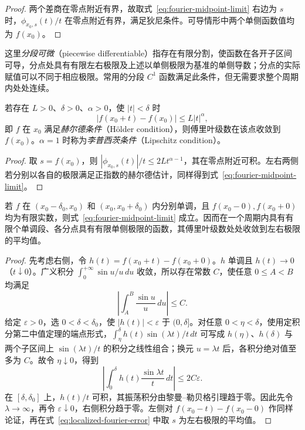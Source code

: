 \begin{proof}
两个差商在零点附近有界，故取式~\eqref{eq:fourier-midpoint-limit} 右边为 $s$ 时，$\phi_{x_0,s}(t)/t$ 在零点附近有界，满足狄尼条件。可导情形中两个单侧函数值均为 $f(x_0)$。
\end{proof}

这里\emph{分段可微}（piecewise differentiable）指存在有限分割，使函数在各开子区间可导，分点处具有有限左右极限及上述以单侧极限为基准的单侧导数；分点的实际赋值可以不同于相应极限。常用的分段 $C^1$ 函数满足此条件，但无需要求整个周期内处处连续。

\begin{corollary}[李普西茨判别法]
\label{cor:holder-fourier-convergence}
若存在 $L>0$、$\delta>0$、$\alpha>0$，使 $|t|<\delta$ 时
\[
    |f(x_0+t)-f(x_0)|\leq L|t|^\alpha,
\]
即 $f$ 在 $x_0$ 满足\emph{赫尔德条件}（H\"older condition），则傅里叶级数在该点收敛到 $f(x_0)$。$\alpha=1$ 时称为\emph{李普西茨条件}（Lipschitz condition）。
\end{corollary}

\begin{proof}
取 $s=f(x_0)$，则 $|\phi_{x_0,s}(t)|/t\leq2Lt^{\alpha-1}$，其在零点附近可积。左右两侧若分别以各自的极限满足正指数的赫尔德估计，同样得到式~\eqref{eq:fourier-midpoint-limit}。
\end{proof}

\begin{theorem}[狄利克雷判别法]
\label{thm:dirichlet-fourier-convergence}
若 $f$ 在 $(x_0-\delta_0,x_0)$ 和 $(x_0,x_0+\delta_0)$ 内分别单调，且 $f(x_0-0),f(x_0+0)$ 均为有限实数，则式~\eqref{eq:fourier-midpoint-limit} 成立。因而在一个周期内具有有限个单调段、各分点具有有限单侧极限的函数，其傅里叶级数处处收敛到左右极限的平均值。
\end{theorem}

\begin{proof}
先考虑右侧，令 $h(t)=f(x_0+t)-f(x_0+0)$。$h$ 单调且 $h(t)\to0$（$t\downarrow0$）。广义积分 $\int_0^{+\infty}\sin u/u\,du$ 收敛，所以存在常数 $C$，使任意 $0\leq A<B$ 均满足
\[
    \left|\int_A^B\frac{\sin u}{u}\,du\right|\leq C.
\]
给定 $\varepsilon>0$，选 $0<\delta<\delta_0$，使 $|h(t)|<\varepsilon$ 于 $(0,\delta]$。对任意 $0<\eta<\delta$，使用定积分第二中值定理的端点形式，$\int_\eta^\delta h(t)\sin(\lambda t)/t\,dt$ 可写成 $h(\eta)$、$h(\delta)$ 与两个子区间上 $\sin(\lambda t)/t$ 的积分之线性组合；换元 $u=\lambda t$ 后，各积分绝对值至多为 $C$。故令 $\eta\downarrow0$，得到
\[
    \left|\int_0^\delta h(t)\frac{\sin\lambda t}{t}\,dt\right|
        \leq2C\varepsilon.
\]
在 $[\delta,\delta_0]$ 上，$h(t)/t$ 可积，其振荡积分由黎曼--勒贝格引理趋于零。因此先令 $\lambda\to\infty$，再令 $\varepsilon\downarrow0$，右侧积分趋于零。左侧对 $f(x_0-t)-f(x_0-0)$ 作同样论证，再在式~\eqref{eq:localized-fourier-error} 中取 $s$ 为左右极限的平均值。
\end{proof}

